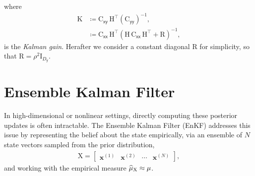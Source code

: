 \documentclass[wcp]{jmlr} %
\newcommand{\vv}[1]{\boldsymbol{#1}}
\newcommand{\mm}[1]{\mathrm{#1}}
\newcommand{\rv}[1]{\mathsf{#1}}
\newcommand{\vrv}[1]{\vv{\rv{#1}}}
\begin{document}
where
\begin{align}
\mm{K}
&\coloneq \mm{C}_{\vrv{xy}}\,\mm{H}^\top \left(\mm{C}_{\vrv{yy}}\right)^{-1},\label{eq:kalman-gain}\\
&\coloneq \mm{C}_{\vrv{xx}}\,\mm{H}^\top \left(\mm{H}\,\mm{C}_{\vrv{xx}}\,\mm{H}^\top + \mm{R}\right)^{-1},
\end{align}
is the \emph{Kalman gain}.
Herafter we consider a constant diagonal \(\mm{R}\) for simplicity, so that \(\mm{R}=\rho^2\mm{I}_{D_{\vrv{y}}}\).

\section{Ensemble Kalman Filter}

In high-dimensional or nonlinear settings, directly computing these posterior updates is often intractable.
The Ensemble Kalman Filter (EnKF) addresses this issue by representing the belief about the state empirically, via an ensemble of \(N\) state vectors sampled from the prior distribution,
\begin{align}
    \mm{X} = \begin{bmatrix} \vv{x}^{(1)} & \vv{x}^{(2)} & \cdots & \vv{x}^{(N)} \end{bmatrix},
\end{align}
and working with the empirical measure $\ELaw[\mm{X}]\approx \Law$.
\end{document}

